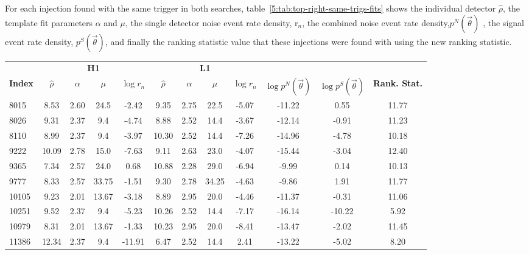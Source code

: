 For each injection found with the same trigger in both searches, table~\ref{5:tab:top-right-same-trigs-fits} shows the individual detector $\hat{\rho}$, the template fit parameters $\alpha$ and $\mu$, the single detector noise event rate density, r$_n$, the combined noise event rate density,$p^{N}(\Vec{\theta})$ , the signal event rate density, $p^{S}(\Vec{\theta})$, and finally the ranking statistic value that these injections were found with using the new ranking statistic.
%
\begin{table}[ht]
    \centering
    \small
    \setlength{\tabcolsep}{4pt}
    \begin{tabular}{lccccccccccc}
        \toprule
        & \multicolumn{4}{c}{\textbf{H1}} & \multicolumn{4}{c}{\textbf{L1}} \\
        \cmidrule(lr){2-5} \cmidrule(lr){6-9}
        \textbf{Index} & \textbf{$\hat{\rho}$} & \textbf{$\alpha$} & \textbf{$\mu$} & \textbf{$\log r_n$} & \textbf{$\hat{\rho}$} & \textbf{$\alpha$} & \textbf{$\mu$} & \textbf{$\log r_n$} & \textbf{$\log p^{N}(\Vec{\theta})$} & \textbf{$\log p^{S}(\Vec{\theta})$} & \textbf{Rank. Stat.} \\
        \midrule
        8015 & 8.53 & 2.60 & 24.5 & -2.42 & 9.35 & 2.75 & 22.5 & -5.07 & -11.22 & 0.55 & 11.77 \\
        8026 & 9.31 & 2.37 & 9.4 & -4.74 & 8.88 & 2.52 & 14.4 & -3.67 & -12.14 & -0.91 & 11.23 \\
        8110 & 8.99 & 2.37 & 9.4 & -3.97 & 10.30 & 2.52 & 14.4 & -7.26 & -14.96 & -4.78 & 10.18 \\
        9222 & 10.09 & 2.78 & 15.0 & -7.63 & 9.11 & 2.63 & 23.0 & -4.07 & -15.44 & -3.04 & 12.40 \\
        9365 & 7.34 & 2.57 & 24.0 & 0.68 & 10.88 & 2.28 & 29.0 & -6.94 & -9.99 & 0.14 & 10.13 \\
        9777 & 8.33 & 2.57 & 33.75 & -1.51 & 9.30 & 2.78 & 34.25 & -4.63 & -9.86 & 1.91 & 11.77 \\
        10105 & 9.23 & 2.01 & 13.67 & -3.18 & 8.89 & 2.95 & 20.0 & -4.46 & -11.37 & -0.31 & 11.06 \\
        10251 & 9.52 & 2.37 & 9.4 & -5.23 & 10.26 & 2.52 & 14.4 & -7.17 & -16.14 & -10.22 & 5.92 \\
        10979 & 8.31 & 2.01 & 13.67 & -1.33 & 10.23 & 2.95 & 20.0 & -8.41 & -13.47 & -2.02 & 11.45 \\
        11386 & 12.34 & 2.37 & 9.4 & -11.91 & 6.47 & 2.52 & 14.4 & 2.41 & -13.22 & -5.02 & 8.20 \\

\end{tabular}
\end{table}
